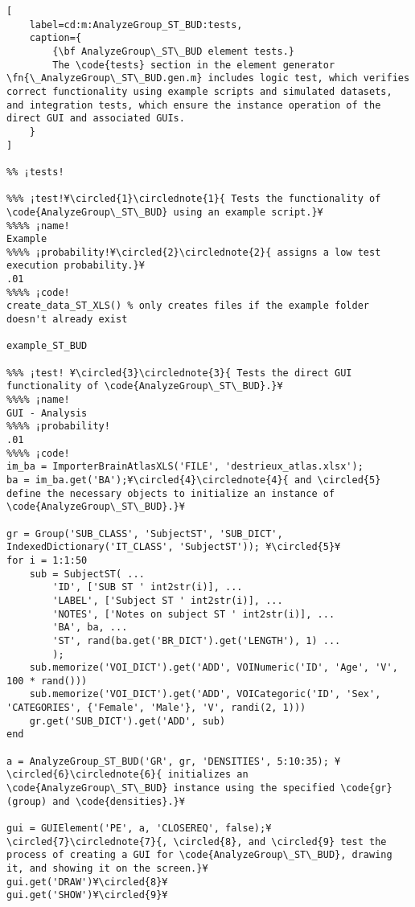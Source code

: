 \documentclass{tufte-handout}
\begin{document}
\begin{lstlisting}[
	label=cd:m:AnalyzeGroup_ST_BUD:tests,
	caption={
		{\bf AnalyzeGroup\_ST\_BUD element tests.}
		The \code{tests} section in the element generator \fn{\_AnalyzeGroup\_ST\_BUD.gen.m} includes logic test, which verifies correct functionality using example scripts and simulated datasets, and integration tests, which ensure the instance operation of the direct GUI and associated GUIs.
	}
]	

%% ¡tests!

%%% ¡test!¥\circled{1}\circlednote{1}{ Tests the functionality of \code{AnalyzeGroup\_ST\_BUD} using an example script.}¥
%%%% ¡name!
Example
%%%% ¡probability!¥\circled{2}\circlednote{2}{ assigns a low test execution probability.}¥
.01
%%%% ¡code! 
create_data_ST_XLS() % only creates files if the example folder doesn't already exist

example_ST_BUD

%%% ¡test! ¥\circled{3}\circlednote{3}{ Tests the direct GUI functionality of \code{AnalyzeGroup\_ST\_BUD}.}¥
%%%% ¡name!
GUI - Analysis
%%%% ¡probability!
.01
%%%% ¡code!
im_ba = ImporterBrainAtlasXLS('FILE', 'destrieux_atlas.xlsx');
ba = im_ba.get('BA');¥\circled{4}\circlednote{4}{ and \circled{5} define the necessary objects to initialize an instance of \code{AnalyzeGroup\_ST\_BUD}.}¥

gr = Group('SUB_CLASS', 'SubjectST', 'SUB_DICT', IndexedDictionary('IT_CLASS', 'SubjectST')); ¥\circled{5}¥
for i = 1:1:50
    sub = SubjectST( ...
        'ID', ['SUB ST ' int2str(i)], ...
        'LABEL', ['Subject ST ' int2str(i)], ...
        'NOTES', ['Notes on subject ST ' int2str(i)], ...
        'BA', ba, ...
        'ST', rand(ba.get('BR_DICT').get('LENGTH'), 1) ...
        );
    sub.memorize('VOI_DICT').get('ADD', VOINumeric('ID', 'Age', 'V', 100 * rand()))
    sub.memorize('VOI_DICT').get('ADD', VOICategoric('ID', 'Sex', 'CATEGORIES', {'Female', 'Male'}, 'V', randi(2, 1)))
    gr.get('SUB_DICT').get('ADD', sub)
end

a = AnalyzeGroup_ST_BUD('GR', gr, 'DENSITIES', 5:10:35); ¥\circled{6}\circlednote{6}{ initializes an \code{AnalyzeGroup\_ST\_BUD} instance using the specified \code{gr} (group) and \code{densities}.}¥

gui = GUIElement('PE', a, 'CLOSEREQ', false);¥\circled{7}\circlednote{7}{, \circled{8}, and \circled{9} test the process of creating a GUI for \code{AnalyzeGroup\_ST\_BUD}, drawing it, and showing it on the screen.}¥
gui.get('DRAW')¥\circled{8}¥
gui.get('SHOW')¥\circled{9}¥


\end{lstlisting}
\end{document}
